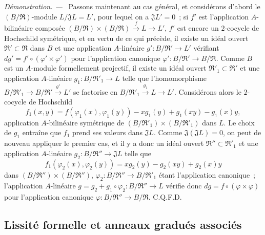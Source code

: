 \documentclass[10pt,oneside]{book}
\newenvironment{proof}{%
  \par\medskip\noindent\textit{Démonstration. ---\ }}{\par}
\begin{document}
\begin{proof}
Passons maintenant au cas général, et considérons d'abord le
$(B/\mathfrak R)$-module $L/\mathfrak JL=L'$, pour lequel on a
$\mathfrak JL'=0$~; si $f'$ est l'application $A$-bilinéaire composée
$(B/\mathfrak R)\times(B/\mathfrak R)\xrightarrow{f}L\to L'$, $f'$ est
encore un $2$-cocycle de Hochschild symétrique, et en vertu de ce qui précède,
il existe un idéal ouvert $\mathfrak R'\subset\mathfrak R$ dans $B$ et
une application $A$-linéaire $g':B/\mathfrak R'\to L'$ vérifiant
$dg'=f'\circ(\varphi'\times\varphi')$ pour l'application canonique
$\varphi':B/\mathfrak R'\to B/\mathfrak R$. Comme $B$ est un
$A$-module formellement projectif, il existe un idéal ouvert
$\mathfrak R'_1\subset\mathfrak R'$ et une application $A$-linéaire
$g_1:B/\mathfrak R'_1\to L$ telle que l'homomorphisme
$B/\mathfrak R'_1\to B/\mathfrak R'\xrightarrow{g'}L'$ se factorise en
$B/\mathfrak R'_1\xrightarrow{g_1}L\to L'$. Considérons alors le
$2$-cocycle de Hochschild
\[
  f_1(x,y)=f(\varphi_1(x),\varphi_1(y))-xg_1(y)+g_1(xy)-g_1(x)y,
\]
application $A$-bilinéaire symétrique de
$(B/\mathfrak R'_1)\times(B/\mathfrak R'_1)$ dans $L$. Le choix de
$g_1$ entraîne que $f_1$ prend ses valeurs dans $\mathfrak JL$. Comme
$\mathfrak J(\mathfrak JL)=0$, on peut de nouveau appliquer le premier cas,
et il y a donc un idéal ouvert
$\mathfrak R''\subset\mathfrak R'_1$ et une application $A$-linéaire
$g_2:B/\mathfrak R''\to\mathfrak JL$ telle que
\[
  f_1(\varphi_2(x),\varphi_2(y))=xg_2(y)-g_2(xy)+g_2(x)y
\]
dans $(B/\mathfrak R'')\times(B/\mathfrak R'')$,
$\varphi_2:B/\mathfrak R''\to B/\mathfrak R'_1$ étant l'application
canonique~; l'application $A$-linéaire
$g=g_2+g_1\circ\varphi_2:B/\mathfrak R''\to L$ vérifie donc
$dg=f\circ(\varphi\times\varphi)$ pour l'application canonique
$\varphi:B/\mathfrak R''\to B/\mathfrak R$. C.Q.F.D.
\end{proof}

\subsection{Lissité formelle et anneaux gradués associés}
\label{subsection:0.19.5-fr}
\end{document}
